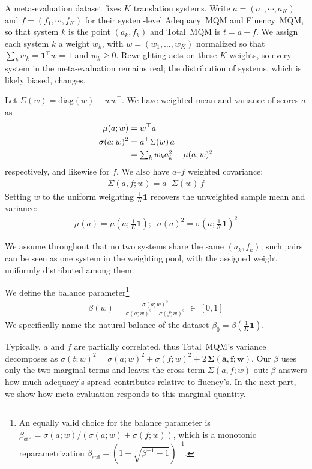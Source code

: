 \documentclass[11pt]{article}
\begin{document}
A meta-evaluation dataset fixes $K$ translation systems. Write $a{=}(a_1,\cdots,a_K)$ and $f{=}(f_1,\cdots,f_K)$ for their system-level Adequacy~MQM and Fluency~MQM, so that system $k$ is the point $(a_k,f_k)$ and Total~MQM is $t{=}a{+}f$. We assign each system $k$ a weight $w_k$, with $w{=}(w_1,\dots,w_K)$ normalized so that $\sum_k w_k = \mathbf 1^\top w = 1$ and $w_k \ge 0$. Reweighting acts on these $K$ weights, so every system in the meta-evaluation remains real; the distribution of systems, which is likely biased, changes.

Let $\Sigma(w) = \mathrm{diag}(w) - ww^\top$. We have weighted mean and variance of scores $a$ as
\begin{align}
  \mu(a;w) &= w^\top a \\
  \sigma(a;w)^2 &= a^\top \Sigma(w)\, a \notag\\&= \textstyle\sum_k w_k a_k^2 - \mu(a;w)^2
\end{align}
respectively, and likewise for $f$.
We also have $a$--$f$ weighted covariance:
\begin{align}
  \Sigma(a,f;w) = a^\top \Sigma(w)\, f
\end{align}
Setting $w$ to the uniform weighting $\tfrac1K\mathbf 1$ recovers the unweighted sample mean and variance:
\begin{align}
  \mu(a) = \mu(a;\tfrac1K\mathbf 1) ;\;\;
  \sigma(a)^2 = \sigma(a;\tfrac1K\mathbf 1)^2
\end{align}

We assume throughout that no two systems share the same $(a_k,f_k)$; such pairs can be seen as one system in the weighting pool, with the assigned weight uniformly distributed among them.

We define the balance parameter\footnote{An equally valid choice for the balance parameter is $\beta_\text{std} = \sigma(a;w)/(\sigma(a;w)+\sigma(f;w))$, which is a monotonic reparametrization $\beta_\text{std} = (1 + \sqrt{\beta^{-1} - 1})^{-1}$.}
\begin{align}
  \beta(w) = \frac{\sigma(a;w)^2}{\sigma(a;w)^2 + \sigma(f;w)^2} \;\in\; [0,1]\tag{*}\label{eq:beta}
\end{align}
We specifically name the natural balance of the dataset $\beta_0 = \beta(\tfrac1K\mathbf 1)$.

Typically, $a$ and $f$ are partially correlated, thus Total~MQM's variance decomposes as $\sigma(t;w)^2 = \sigma(a;w)^2 + \sigma(f;w)^2 + 2\,\boldsymbol{\Sigma(a,f;w)}$. Our $\beta$ uses only the two marginal terms and leaves the cross term $\Sigma(a,f;w)$ out: $\beta$ answers how much adequacy's spread contributes relative to fluency's. In the next part, we show how meta-evaluation responds to this marginal quantity.
\end{document}
